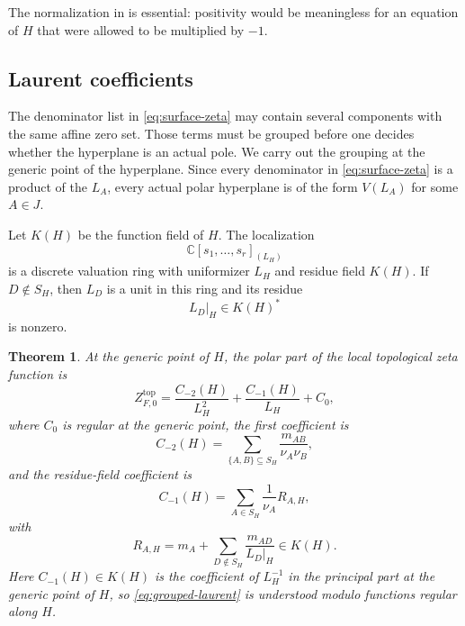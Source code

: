\documentclass[12pt]{amsart}
\numberwithin{equation}{section}
\theoremstyle{plain}
\newtheorem{theorem}{Theorem}[section]
\theoremstyle{definition}
\theoremstyle{remark}
\theoremstyle{definition}
\newcommand{\C}{\mathbb C}
\begin{document}
The normalization in  is essential: positivity would be meaningless for an equation of $H$ that were allowed to be multiplied by $-1$.



\subsection{Laurent coefficients}

The denominator list in \eqref{eq:surface-zeta} may contain several components with the same affine zero set. Those terms must be grouped before one decides whether the hyperplane is an actual pole. We carry out the grouping at the generic point of the hyperplane. Since every denominator in \eqref{eq:surface-zeta} is a product of the $L_A$, every actual polar hyperplane is of the form $V(L_A)$ for some $A\in J$.

Let $K(H)$ be the function field of $H$. The localization
\[
 \C[s_1,\ldots,s_r]_{(L_H)}
\]
is a discrete valuation ring with uniformizer $L_H$ and residue field $K(H)$. If $D\notin S_H$, then $L_D$ is a unit in this ring and its residue
\[
 L_D|_H\in K(H)^*
\]
is nonzero.

\begin{theorem}
\label{thm:grouped-laurent}
At the generic point of $H$, the polar part of the local topological zeta function is
\begin{equation}\label{eq:grouped-laurent}
 Z^{\mathrm{top}}_{F,0}
 =
 \frac{C_{-2}(H)}{L_H^2}
 +
 \frac{C_{-1}(H)}{L_H}
 +C_0,
\end{equation}
where $C_0$ is regular at the generic point, the first coefficient is
\begin{equation}\label{eq:grouped-double-coefficient}
 C_{-2}(H)
 =
 \sum_{\{A,B\}\subseteq S_H}
 \frac{m_{AB}}{\nu_A\nu_B},
\end{equation}
and the residue-field coefficient is
\begin{equation}\label{eq:grouped-simple-coefficient}
 C_{-1}(H)
 =
 \sum_{A\in S_H}\frac{1}{\nu_A}R_{A,H},
\end{equation}
with
\begin{equation}\label{eq:component-wall-residue}
 R_{A,H}
 =
 m_A
 +
 \sum_{D\notin S_H}
 \frac{m_{AD}}{L_D|_H}
 \in K(H).
\end{equation}
Here $C_{-1}(H)\in K(H)$ is the coefficient of $L_H^{-1}$ in the principal part at the generic point of $H$, so \eqref{eq:grouped-laurent} is understood modulo functions regular along $H$.
\end{theorem}
\end{document}
